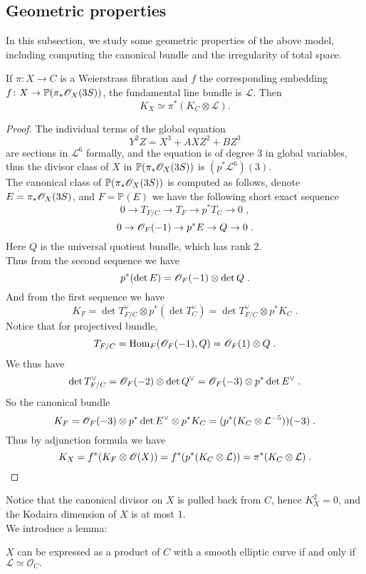 \subsection{Geometric properties}
In this subsection, we study some geometric properties of the above model, including computing the canonical bundle and the irregularity of total space.
\begin{proposition}
If $\pi\colon X\rightarrow C$ is a Weierstrass fibration and $f$ the corresponding embedding $f\colon X\rightarrow \mathbb{P}(\pi_*\mathscr{O}_{X}(3S))$, the fundamental line bundle is $\mathcal{L}$. Then
\[ K_X\simeq \pi^*(K_C\otimes \mathcal{L}). \]
\end{proposition}
\begin{proof}
The individual terms of the global equation 
\[ Y^2Z=X^3+AXZ^2+BZ^3 \]
are sections in $\mathcal{L}^6$ formally, and the equation is of degree 3 in global variables, thus the divisor class of $X$ in $\mathbb{P}(\pi_*\mathscr{O}_{X}(3S))$ is $(p^*\mathcal{L}^6)(3)$.\\ \indent
The canonical class of $\mathbb{P}(\pi_*\mathscr{O}_{X}(3S))$ is computed as follows, denote $E=\pi_*\mathscr{O}_{X}(3S)$, and $F=\mathbb{P}(E)$ we have the following short exact sequence 
\[ 0\rightarrow T_{F/C}\rightarrow T_F\rightarrow p^*T_C\rightarrow 0\; , \]
\[ 0\rightarrow \mathscr{O}_F(-1)\rightarrow p^*E\rightarrow Q\rightarrow 0\; . \]
Here $Q$ is the universal quotient bundle, which has rank 2.\\ \indent
Thus from the second sequence we have 
\[ p^*(\det E)=\mathscr{O}_F(-1) \otimes \det Q\; . \]
And from the first sequence we have
\[ K_F=\det T_{F/C}^\vee\otimes p^*(\det T_C^\vee)=\det T_{F/C}^\vee\otimes p^* K_C\; . \]
Notice that for projectived bundle,
\[ T_{F/C}=\operatorname{Hom}_F(\mathscr{O}_{F}(-1), Q)=\mathscr{O}_{F}(1) \otimes Q\; . \]
We thus have
\[ \det T_{F/C}^\vee=\mathscr{O}_F(-2)\otimes \det Q^\vee=\mathscr{O}_F(-3)\otimes p^*\det E^\vee\; . \]
So the canonical bundle
\[ K_F=\mathscr{O}_F(-3)\otimes p^*\det E^\vee\otimes p^*K_C=(p^*(K_C\otimes\mathcal{L}^{-5}))(-3)\; . \]
Thus by adjunction formula we have
\[ K_X=f^*(K_F\otimes\mathscr{O}(X))=f^*(p^*(K_C\otimes\mathcal{L}))=\pi^*(K_C\otimes\mathcal{L})\; . \qedhere\] 
\end{proof}
Notice that the canonical divisor on $X$ is pulled back from $C$, hence $K_X^2=0$, and the Kodaira dimension of $X$ is at most 1.\\ \indent
We introduce a lemma:
\begin{lemma}
$X$ can be expressed as a product of $C$ with a smooth elliptic curve if and only if $\mathscr{L}\simeq \mathscr{O}_C.$
\end{lemma}
